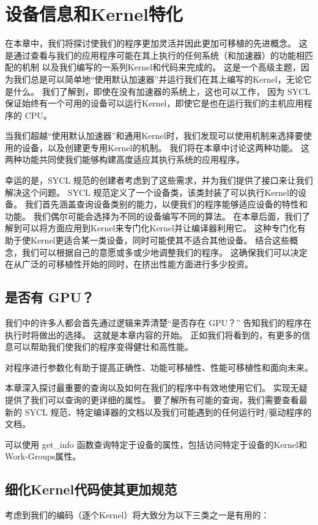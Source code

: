 \section{设备信息和Kernel特化}
在本章中，我们将探讨使我们的程序更加灵活并因此更加可移植的先进概念。 
这是通过查看与我们的应用程序可能在其上执行的任何系统（和加速器）的功能相匹配的机制
以及我们编写的一系列Kernel和代码来完成的。 
这是一个高级主题，因为我们总是可以简单地“使用默认加速器”并运行我们在其上编写的Kernel，无论它是什么。 
我们了解到，即使在没有加速器的系统上，这也可以工作，
因为 SYCL 保证始终有一个可用的设备可以运行Kernel，即使它是也在运行我们的主机应用程序的 CPU。

当我们超越“使用默认加速器”和通用Kernel时，我们发现可以使用机制来选择要使用的设备，以及创建更专用Kernel的机制。 
我们将在本章中讨论这两种功能。 这两种功能共同使我们能够构建高度适应其执行系统的应用程序。

幸运的是，SYCL 规范的创建者考虑到了这些需求，并为我们提供了接口来让我们解决这个问题。 
SYCL 规范定义了一个设备类，该类封装了可以执行Kernel的设备。 
我们首先涵盖查询设备类别的能力，以便我们的程序能够适应设备的特性和功能。 
我们偶尔可能会选择为不同的设备编写不同的算法。 
在本章后面，我们了解到可以将方面应用到Kernel来专门化Kernel并让编译器利用它。 
这种专门化有助于使Kernel更适合某一类设备，同时可能使其不适合其他设备。 
结合这些概念，我们可以根据自己的意愿或多或少地调整我们的程序。 
这确保我们可以决定在从广泛的可移植性开始的同时，在挤出性能方面进行多少投资。

\subsection{是否有 GPU？}
我们中的许多人都会首先通过逻辑来弄清楚“是否存在 GPU？” 告知我们的程序在执行时将做出的选择。 
这就是本章内容的开始。 正如我们将看到的，有更多的信息可以帮助我们使我们的程序变得健壮和高性能。

\begin{remark}
	对程序进行参数化有助于提高正确性、功能可移植性、性能可移植性和面向未来。
\end{remark}

本章深入探讨最重要的查询以及如何在我们的程序中有效地使用它们。 实现无疑提供了我们可以查询的更详细的属性。 
要了解所有可能的查询，我们需要查看最新的 SYCL 规范、特定编译器的文档以及我们可能遇到的任何运行时/驱动程序的文档。

可以使用 get\_info 函数查询特定于设备的属性，包括访问特定于设备的Kernel和Work-Groups属性。

\subsection{细化Kernel代码使其更加规范}
考虑到我们的编码（逐个Kernel）将大致分为以下三类之一是有用的：

